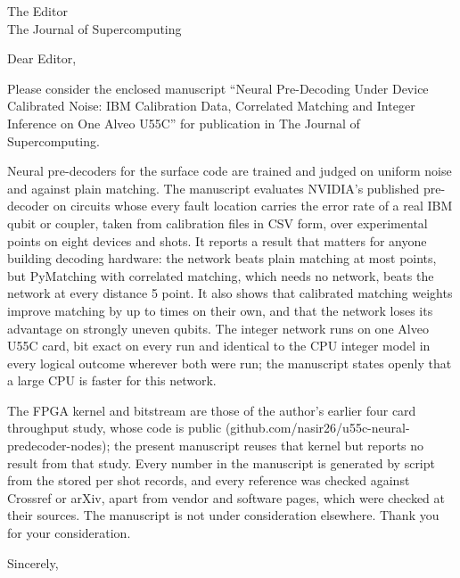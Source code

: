 \documentclass[11pt]{letter}
\begin{document}
\begin{letter}{The Editor\\The Journal of Supercomputing}
\opening{Dear Editor,}

Please consider the enclosed manuscript ``Neural Pre-Decoding Under Device Calibrated Noise: IBM Calibration Data,
Correlated Matching and Integer Inference on One Alveo U55C'' for publication in The Journal of Supercomputing.

Neural pre-decoders for the surface code are trained and judged on uniform noise and against plain matching. The
manuscript evaluates NVIDIA's published pre-decoder on circuits whose every fault location carries the error rate of
a real IBM qubit or coupler, taken from calibration files in CSV form, over \NumPoints{} experimental points on eight
devices and \TotalShots{} shots. It reports a result that matters for anyone building decoding hardware: the network
beats plain matching at most points, but PyMatching with correlated matching, which needs no network, beats the
network at every distance 5 point. It also shows that calibrated matching weights improve matching by up to
\MedWeightsMax{} times on their own, and that the network loses its advantage on strongly uneven qubits. The integer
network runs on one Alveo U55C card, bit exact on every run and identical to the CPU integer model in every logical
outcome wherever both were run; the manuscript states openly that a large CPU is faster for this network.

The FPGA kernel and bitstream are those of the author's earlier four card throughput study, whose code is public
(github.com/nasir26/u55c-neural-predecoder-nodes); the present manuscript reuses that kernel but reports no result
from that study. Every number in the manuscript is generated by script from the stored per shot records, and every
reference was checked against Crossref or arXiv, apart from vendor and software pages, which were checked at their
sources. The manuscript is not under consideration elsewhere. Thank you for your consideration.

\closing{Sincerely,}
\end{letter}
\end{document}
